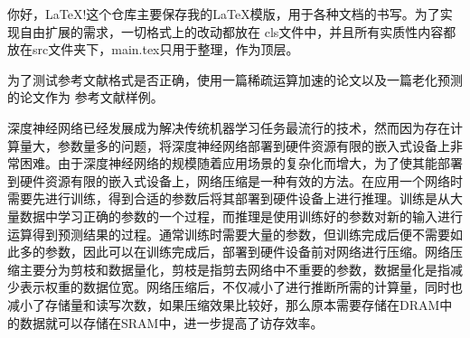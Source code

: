 你好，\LaTeX!这个仓库主要保存我的\LaTeX 模版，用于各种文档的书写。为了实现自由扩展的需求，一切格式上的改动都放在
cls文件中，并且所有实质性内容都放在src文件夹下，main.tex只用于整理，作为顶层。

为了测试参考文献格式是否正确，使用一篇稀疏运算加速的论文以及一篇老化预测的论文作为
参考文献样例。

深度神经网络已经发展成为解决传统机器学习任务最流行的技术，然而因为存在计算量大，参数量多的问题，将深度神经网络部署到硬件资源有限的嵌入式设备上非常困难。由于深度神经网络的规模随着应用场景的复杂化而增大，为了使其能部署到硬件资源有限的嵌入式设备上，网络压缩是一种有效的方法。在应用一个网络时需要先进行训练，得到合适的参数后将其部署到硬件设备上进行推理。训练是从大量数据中学习正确的参数的一个过程，而推理是使用训练好的参数对新的输入进行运算得到预测结果的过程。通常训练时需要大量的参数，但训练完成后便不需要如此多的参数，因此可以在训练完成后，部署到硬件设备前对网络进行压缩。网络压缩主要分为剪枝和数据量化，剪枝是指剪去网络中不重要的参数，数据量化是指减少表示权重的数据位宽。网络压缩后，不仅减小了进行推断所需的计算量，同时也减小了存储量和读写次数，如果压缩效果比较好，那么原本需要存储在DRAM中的数据就可以存储在SRAM中，进一步提高了访存效率。